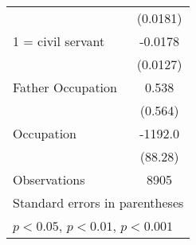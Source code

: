 \begin{table}[htbp]
\begin{tabular}{l*{1}{c}}
                    &    (0.0181)         \\
[1em]
1 = civil servant   &     -0.0178         \\
                    &    (0.0127)         \\
[1em]
Father Occupation   &       0.538         \\
                    &     (0.564)         \\
[1em]
Occupation          &     -1192.0\sym{***}\\
                    &     (88.28)         \\
\hline
Observations        &        8905         \\
\hline\hline
\multicolumn{2}{l}{\footnotesize Standard errors in parentheses}\\
\multicolumn{2}{l}{\footnotesize \sym{*} \(p<0.05\), \sym{**} \(p<0.01\), \sym{***} \(p<0.001\)}\\
\end{tabular}
\end{table}
